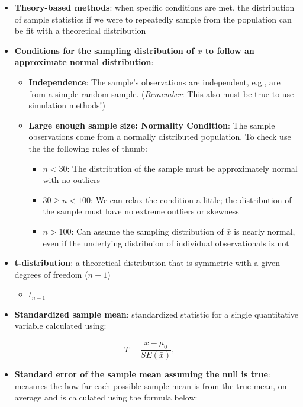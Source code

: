 \documentclass[
]{report}
\providecommand{\tightlist}{%
  \setlength{\itemsep}{0pt}\setlength{\parskip}{0pt}}
\begin{document}
\begin{itemize}
\item
  \textbf{Theory-based methods}: when specific conditions are met, the distribution of sample statistics if we were to repeatedly sample from the population can be fit with a theoretical distribution
\item
  \textbf{Conditions for the sampling distribution of \(\bar{x}\) to follow an approximate normal distribution}:

  \begin{itemize}
  \item
    \textbf{Independence}: The sample's observations are independent, e.g., are from a simple random sample. (\emph{Remember}: This also must be true to use simulation methods!)
  \item
    \textbf{Large enough sample size: Normality Condition}: The sample observations come from a normally distributed population. To check use the the following rules of thumb:

    \begin{itemize}
    \item
      \(n < 30\): The distribution of the sample must be approximately normal with no outliers
    \item
      \(30 \ge n < 100\): We can relax the condition a little; the distribution of the sample must have no extreme outliers or skewness
    \item
      \(n > 100\): Can assume the sampling distribution of \(\bar{x}\) is nearly normal, even if the underlying distribuion of individual observationals is not
    \end{itemize}
  \end{itemize}
\item
  \textbf{t-distribution}: a theoretical distribution that is symmetric with a given degrees of freedom (\(n-1\))

  \begin{itemize}
  \tightlist
  \item
    \(t_{n-1}\)
  \end{itemize}
\item
  \textbf{Standardized sample mean}: standardized statistic for a single quantitative variable calculated using:
\end{itemize}

\[
T = \frac{\bar{x} - \mu_0}{SE(\bar{x})},
\]

\begin{itemize}
\tightlist
\item
  \textbf{Standard error of the sample mean assuming the null is true}: measures the how far each possible sample mean is from the true mean, on average and is calculated using the formula below:
\end{itemize}
\end{document}
